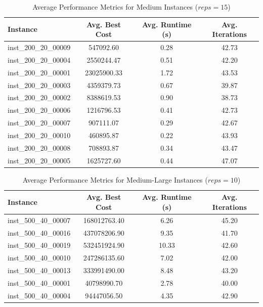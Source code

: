 \documentclass{article}
\begin{document}
\begin{table}[H]
\centering
\caption{Average Performance Metrics for Medium Instances ($reps=15$)}
\begin{tabular}{lccc}
\toprule
\textbf{Instance} & \textbf{Avg. Best Cost} & \textbf{Avg. Runtime (s)} & \textbf{Avg. Iterations} \\
\midrule
inst\_200\_20\_00009 & 547092.60   & 0.28 & 42.73 \\
inst\_200\_20\_00004 & 2550244.47  & 0.51 & 42.20 \\
inst\_200\_20\_00001 & 23025900.33 & 1.72 & 43.53 \\
inst\_200\_20\_00003 & 4359379.73  & 0.67 & 39.87 \\
inst\_200\_20\_00002 & 8388619.53  & 0.90 & 38.73 \\
inst\_200\_20\_00006 & 1216796.53  & 0.41 & 42.73 \\
inst\_200\_20\_00007 & 907111.07   & 0.29 & 42.67 \\
inst\_200\_20\_00010 & 460895.87   & 0.22 & 43.93 \\
inst\_200\_20\_00008 & 708893.87   & 0.34 & 43.47 \\
inst\_200\_20\_00005 & 1625727.60  & 0.44 & 47.07 \\
\bottomrule
\end{tabular}
\label{tab:avg_metrics_200_20}
\end{table}

\begin{table}[H]
\centering
\caption{Average Performance Metrics for Medium-Large Instances ($reps=10$)}
\begin{tabular}{lccc}
\toprule
\textbf{Instance} & \textbf{Avg. Best Cost} & \textbf{Avg. Runtime (s)} & \textbf{Avg. Iterations} \\
\midrule
inst\_500\_40\_00007 & 168012763.40 & 6.26 & 45.20 \\
inst\_500\_40\_00016 & 437078206.90 & 9.35 & 41.70 \\
inst\_500\_40\_00019 & 532451924.90 & 10.33 & 42.60 \\
inst\_500\_40\_00010 & 247286135.60 & 7.02 & 42.00 \\
inst\_500\_40\_00013 & 333991490.00 & 8.48 & 43.20 \\
inst\_500\_40\_00001 & 40798990.70  & 2.78 & 40.00 \\
inst\_500\_40\_00004 & 94447056.50  & 4.35 & 42.90 \\
\bottomrule
\end{tabular}
\label{tab:avg_metrics_500_40}
\end{table}
\end{document}
